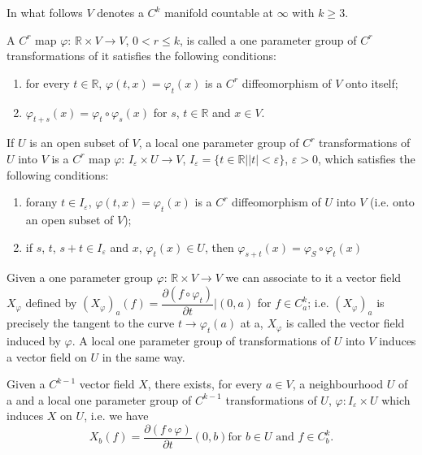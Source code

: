 In what follows $V$ denotes a $C^k$ manifold countable at $\infty$
with $k \geq 3$. 
\begin{defi*}
  A $C^r$ map $\varphi$: $\mathbb{R} \times V \to V$, $0 < r \leq k$,
  is called a one parameter group of $C^r$ transformations of it
  satisfies the following conditions: 
  \begin{enumerate}[(1)]
  \item for every $t \in \mathbb{R}$, $\varphi (t, x) = \varphi_t (x)$
    is a $C^r$ diffeomorphism of $V$ onto itself; 
  \item $\varphi_{t + s} (x) = \varphi_t \circ \varphi_s (x)$ for $s$, $t
    \in \mathbb{R}$ and $x \in V$. 
  \end{enumerate}
\end{defi*}

\begin{defi*}
  If $U$ is an open subset of $V$, a local one parameter group of
  $C^r$ transformations of $U$ into $V$ is a $C^r$ map $\varphi$: $I_
  \varepsilon \times U \to V$, $I_{\varepsilon} = \{t \in \mathbb{R} \big | |t| <
  \varepsilon \}$, $\varepsilon > 0$, which satisfies the following
  conditions: 
  \begin{enumerate}
  \item for\pageoriginale any $t \in I_{\varepsilon}$, $\varphi (t, x) = \varphi_t
    (x)$ is a $C^r$ diffeomorphism of $U$ into $V$ (i.e. onto an open
    subset of $V$); 
  \item if $s$, $t$, $s+t \in I_ \varepsilon$ and $x$, $\varphi_t (x)
    \in U$, then $\varphi_{s + t}(x) = \varphi_S \circ \varphi_t (x)$ 
  \end{enumerate}
\end{defi*}

Given a one parameter group $\varphi$: $\mathbb{R} \times V \to V$ we
can associate to it a vector field $X_\varphi$ defined by $(X_
\varphi)_a (f) = \dfrac{\partial (f \circ \varphi_t)}{\partial t} \big
| (0, a)$ for $f \in C^k_a$;  i.e. $(X_{\varphi})_a$ is precisely the
tangent to the curve $t \to \varphi_t (a)$ at a, $ X_ \varphi $ is
called the vector field induced by $\varphi$. A local one parameter
group of transformations of $U$ into $V$ induces a vector field on $U$
in the same way. 

\setcounter{proposition}{0}
\begin{proposition}\label{chap2:sec6:prop1}%
  Given a $C^{k-1}$ vector field $X$, there exists, for every $a \in
  V$, a neighbourhood $U$ of a and a local one parameter group of
  $C^{k-1}$ transformations of $U$, $\varphi : I_{\varepsilon} \times
  U$ which induces $X$ on $U$, i.e. we have  
  $$
  X_b (f) = \frac{\partial (f \circ \varphi)}{\partial t} (0, b) \text{
    for } b \in U \text{ and } f \in C^k_b. 
  $$
\end{proposition}

